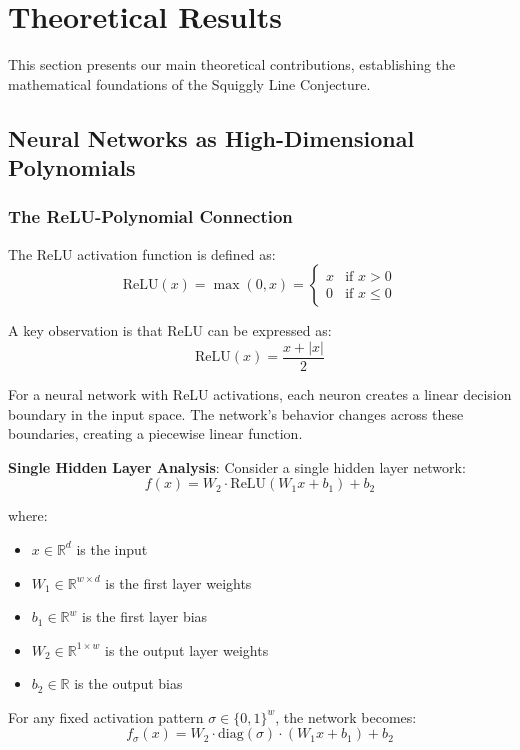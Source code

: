 \section{Theoretical Results}
\label{sec:theory}

This section presents our main theoretical contributions, establishing the mathematical foundations of the Squiggly Line Conjecture.

\subsection{Neural Networks as High-Dimensional Polynomials}

\subsubsection{The ReLU-Polynomial Connection}

The ReLU activation function is defined as:
$$\text{ReLU}(x) = \max(0, x) = \begin{cases} x & \text{if } x > 0 \\ 0 & \text{if } x \leq 0 \end{cases}$$

A key observation is that ReLU can be expressed as:
$$\text{ReLU}(x) = \frac{x + |x|}{2}$$

For a neural network with ReLU activations, each neuron creates a linear decision boundary in the input space. The network's behavior changes across these boundaries, creating a piecewise linear function.

\textbf{Single Hidden Layer Analysis}: Consider a single hidden layer network:
$$f(x) = W_2 \cdot \text{ReLU}(W_1 x + b_1) + b_2$$

where:
\begin{itemize}
    \item $x \in \mathbb{R}^d$ is the input
    \item $W_1 \in \mathbb{R}^{w \times d}$ is the first layer weights
    \item $b_1 \in \mathbb{R}^w$ is the first layer bias
    \item $W_2 \in \mathbb{R}^{1 \times w}$ is the output layer weights
    \item $b_2 \in \mathbb{R}$ is the output bias
\end{itemize}

For any fixed activation pattern $\sigma \in \{0,1\}^w$, the network becomes:
$$f_\sigma(x) = W_2 \cdot \text{diag}(\sigma) \cdot (W_1 x + b_1) + b_2$$

